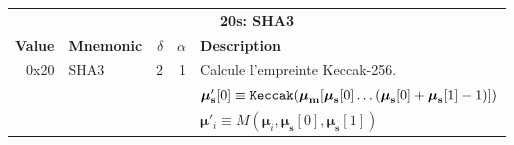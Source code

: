 \documentclass[9pt,oneside]{amsart}
\begin{document}
\begin{tabular*}{\columnwidth}[h]{rlrrl}
\toprule
\multicolumn{5}{c}{\textbf{20s: SHA3}} \vspace{5pt} \\
\textbf{Value} & \textbf{Mnemonic} & $\delta$ & $\alpha$ & \textbf{Description} \vspace{5pt} \\
0x20 & {\small SHA3} & 2 & 1 & Calcule l'empreinte Keccak-256. \\
&&&& $\boldsymbol{\mu}'_\mathbf{s}[0] \equiv \mathtt{\tiny Keccak}(\boldsymbol{\mu}_\mathbf{m}[ \boldsymbol{\mu}_\mathbf{s}[0] \dots (\boldsymbol{\mu}_\mathbf{s}[0] + \boldsymbol{\mu}_\mathbf{s}[1] - 1) ])$ \\
&&&& $\boldsymbol{\mu}'_i \equiv M(\boldsymbol{\mu}_i, \boldsymbol{\mu}_\mathbf{s}[0], \boldsymbol{\mu}_\mathbf{s}[1])$ \\
\bottomrule
\end{tabular*}
\end{document}
